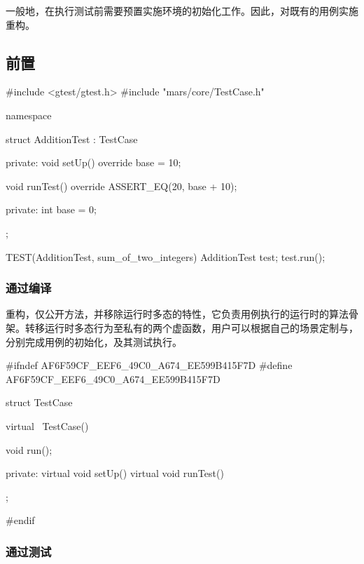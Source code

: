 \begin{content}

一般地，在执行测试前需要预置实施环境的初始化工作。因此，对既有的用例实施重构。

\subsection{前置}

\begin{leftbar}
 \begin{c++}[caption={\ttfamily{test/mars/core/TestCaseSpec.cc}}]
#include <gtest/gtest.h>
#include "mars/core/TestCase.h"

namespace {
  struct AdditionTest : TestCase {
  private:
    void setUp() override {
      base = 10;
    }

    void runTest() override {
      ASSERT_EQ(20, base + 10);
    }

  private:
    int base = 0;
  };
}

TEST(AdditionTest, sum_of_two_integers) {
  AdditionTest test;
  test.run();
}
 \end{c++}
\end{leftbar}

\subsubsection{通过编译}

重构，仅公开方法，并移除运行时多态的特性，它负责用例执行的运行时的算法骨架。转移运行时多态行为至私有的两个虚函数，用户可以根据自己的场景定制与，分别完成用例的初始化，及其测试执行。

\begin{leftbar}
 \begin{c++}[caption={\ttfamily{include/mars/core/TestCase.h}}]
#ifndef AF6F59CF_EEF6_49C0_A674_EE599B415F7D
#define AF6F59CF_EEF6_49C0_A674_EE599B415F7D

struct TestCase {
  virtual ~TestCase() {}

  void run();

private:
  virtual void setUp() {}
  virtual void runTest() {}
};

#endif
  \end{c++}
\end{leftbar}

\subsubsection{通过测试}


\end{content}

